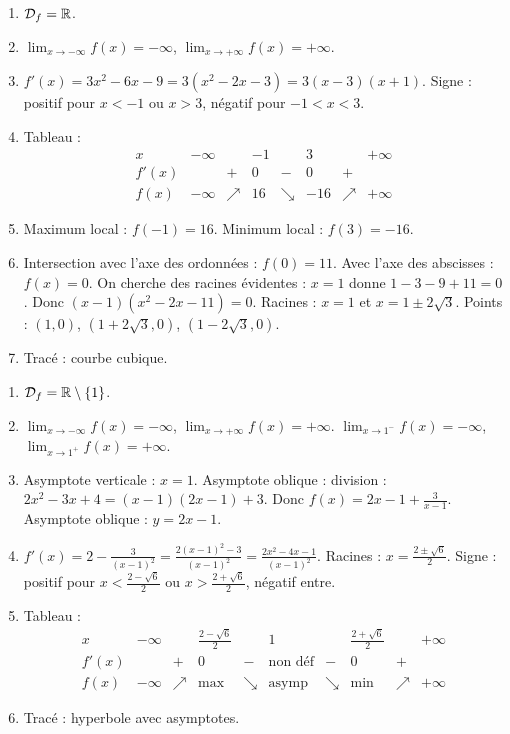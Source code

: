 \begin{enumerate}[label=\arabic*)]
\item \(\mathcal{D}_f=\mathbb{R}\).
\item \(\lim_{x\to -\infty}f(x)=-\infty\), \(\lim_{x\to +\infty}f(x)=+\infty\).
\item \(f'(x)=3x^2-6x-9=3(x^2-2x-3)=3(x-3)(x+1)\). Signe : positif pour \(x<-1\) ou \(x>3\), négatif pour \(-1<x<3\).
\item Tableau :
\[
\begin{array}{c|ccccccccccc}
x & -\infty & & -1 & & 3 & & +\infty \\
\hline
f'(x) & & + & 0 & - & 0 & + & \\
\hline
f(x) & -\infty & \nearrow & 16 & \searrow & -16 & \nearrow & +\infty
\end{array}
\]
\item Maximum local : \(f(-1)=16\). Minimum local : \(f(3)=-16\).
\item Intersection avec l'axe des ordonnées : \(f(0)=11\). Avec l'axe des abscisses : \(f(x)=0\). On cherche des racines évidentes : \(x=1\) donne \(1-3-9+11=0\). Donc \((x-1)(x^2-2x-11)=0\). Racines : \(x=1\) et \(x=1\pm2\sqrt{3}\). Points : \((1,0)\), \((1+2\sqrt{3},0)\), \((1-2\sqrt{3},0)\).
\item Tracé : courbe cubique.
\end{enumerate}

\begin{enumerate}[label=\arabic*)]
\item \(\mathcal{D}_f=\mathbb{R}\setminus\{1\}\).
\item \(\lim_{x\to -\infty}f(x)=-\infty\), \(\lim_{x\to +\infty}f(x)=+\infty\). \(\lim_{x\to 1^-}f(x)=-\infty\), \(\lim_{x\to 1^+}f(x)=+\infty\).
\item Asymptote verticale : \(x=1\). Asymptote oblique : division : \(2x^2-3x+4=(x-1)(2x-1)+3\). Donc \(f(x)=2x-1+\frac{3}{x-1}\). Asymptote oblique : \(y=2x-1\).
\item \(f'(x)=2-\frac{3}{(x-1)^2}=\frac{2(x-1)^2-3}{(x-1)^2}=\frac{2x^2-4x-1}{(x-1)^2}\). Racines : \(x=\frac{2\pm\sqrt{6}}{2}\). Signe : positif pour \(x<\frac{2-\sqrt{6}}{2}\) ou \(x>\frac{2+\sqrt{6}}{2}\), négatif entre.
\item Tableau :
\[
\begin{array}{c|ccccccccccc}
x & -\infty & & \frac{2-\sqrt{6}}{2} & & 1 & & \frac{2+\sqrt{6}}{2} & & +\infty \\
\hline
f'(x) & & + & 0 & - & \text{non déf} & - & 0 & + & \\
\hline
f(x) & -\infty & \nearrow & \text{max} & \searrow & \text{asymp} & \searrow & \text{min} & \nearrow & +\infty
\end{array}
\]
\item Tracé : hyperbole avec asymptotes.
\end{enumerate}